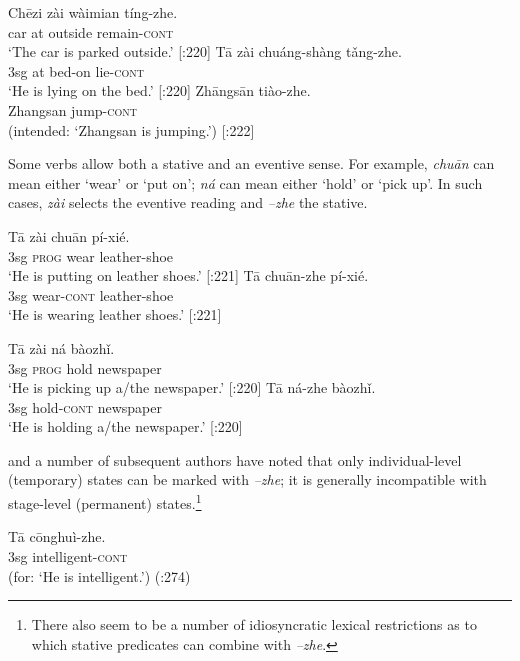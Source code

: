 \ea \label{ex:20.22}
\ea  \gll  Ch\=ezi  zài  wàimian  tíng-zhe.\\
car  at  outside  remain-\textsc{cont} \\
\glt ‘The car is parked outside.’  [\citealt{LiThompson1981}:220]
\ex \gll  T\=a  zài  chuáng-shàng  tǎng-zhe.\\
3sg  at  bed-on  lie-\textsc{cont}\\
\glt ‘He is lying on the bed.’  [\citealt{LiThompson1981}:220]
\ex \gll  *Zh\=angs\=an  tiào-zhe.\\
  Zhangsan  jump-\textsc{cont}\\
\glt (intended: ‘Zhangsan is jumping.’)   [\citealt{LiThompson1981}:222]
\z \z


Some verbs allow both a stative and an eventive sense. For example, \textit{chu\=an} can mean either ‘wear’ or ‘put on’; \textit{ná} can mean either ‘hold’ or ‘pick up’. In such cases, \textit{zài} selects the eventive reading and \textit{–zhe} the stative.


\ea \label{ex:20.23}
\ea  \gll  T\=a  zài  chu\=an  pí-xié.\\
3sg  \textsc{prog}  wear  leather-shoe\\
\glt ‘He is putting on leather shoes.’  [\citealt{LiThompson1981}:221]
\ex \gll T\=a  chu\=an-zhe  pí-xié.\\
3sg  wear-\textsc{cont}  leather-shoe\\
\glt ‘He is wearing leather shoes.’  [\citealt{LiThompson1981}:221]
\z \z

\ea \label{ex:20.24}
\ea  \gll  T\=a  zài  ná  bàozhǐ.\\
3sg  \textsc{prog}  hold  newspaper\\
\glt ‘He is picking up a/the newspaper.’  [\citealt{LiThompson1981}:220]
\ex \gll  T\=a  ná-zhe  bàozhǐ.\\
3sg  hold-\textsc{cont}  newspaper\\
\glt ‘He is holding a/the newspaper.’  [\citealt{LiThompson1981}:220]
\z \z


\citet{Yeh1993} and a number of subsequent authors have noted that only individual-level (temporary) states can be marked with \textit{–zhe}; it is generally incompatible with stage-level (permanent) states.\footnote{There also seem to be a number of idiosyncratic lexical restrictions as to which stative predicates can combine with \textit{–zhe}.}


\ea \label{ex:20.25}
\gll   *T\=a  c\=onghuì-zhe.\\
  3sg  intelligent-\textsc{cont}  \\
\glt (for: ‘He is intelligent.’)  (\citealt{Smith1997}:274)
\z


